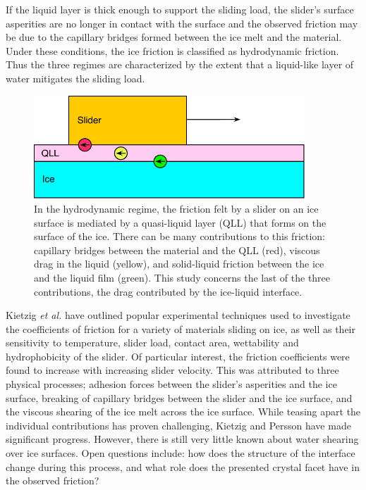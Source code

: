 \documentclass[journal = jpccck, manuscript = article]{achemso}
\begin{document}
If the liquid layer is thick enough to support the sliding load, the
slider's surface asperities are no longer in contact with the surface
and the observed friction may be due to the capillary bridges formed
between the ice melt and the material. Under these conditions, the ice
friction is classified as hydrodynamic
friction.\cite{Kietzig2009,Kietzig2010} Thus the three regimes are
characterized by the extent that a liquid-like layer of water
mitigates the sliding load.

\begin{figure}
\includegraphics[width=4in]{QLLsketch}
\caption{\label{fig:QLLsketch} In the hydrodynamic regime, the
  friction felt by a slider on an ice surface is mediated by a
  quasi-liquid layer (QLL) that forms on the surface of the ice.
  There can be many contributions to this friction: capillary bridges
  between the material and the QLL (red), viscous drag in the liquid
  (yellow), and solid-liquid friction between the ice and the liquid
  film (green). This study concerns the last of the three
  contributions, the drag contributed by the ice-liquid interface.}
\end{figure}

Kietzig \textit{et al.} have outlined popular experimental techniques
used to investigate the coefficients of friction for a variety of
materials sliding on ice, as well as their sensitivity to temperature,
slider load, contact area, wettability and hydrophobicity of the
slider.\cite{Kietzig2010} Of particular interest, the friction
coefficients were found to increase with increasing slider
velocity. This was attributed to three physical processes; adhesion
forces between the slider's asperities and the ice surface, breaking
of capillary bridges between the slider and the ice surface, and the
viscous shearing of the ice melt across the ice surface. While teasing
apart the individual contributions has proven challenging,
Kietzig\cite{Kietzig2009} and Persson\cite{Persson2015,Tuononen2016}
have made significant progress. However, there is still very little
known about water shearing over ice surfaces. Open questions include:
how does the structure of the interface change during this process,
and what role does the presented crystal facet have in the observed
friction?
\end{document}
